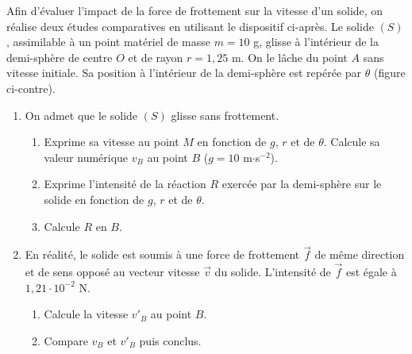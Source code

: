 \documentclass[11pt]{article}
\begin{document}
\begin{minipage}{0.55\linewidth}
Afin d'évaluer l'impact de la force de frottement sur la vitesse d'un solide, on réalise deux études comparatives en utilisant le dispositif ci-après. Le solide $(S)$, assimilable à un point matériel de masse $m = 10$ g, glisse à l'intérieur de la demi-sphère de centre $O$ et de rayon $r = 1{,}25$ m. On le lâche du point $A$ sans vitesse initiale. Sa position à l'intérieur de la demi-sphère est repérée par $\theta$ (figure ci-contre).
\end{minipage}\hfill
\begin{minipage}{0.42\linewidth}
\centering
{}
\end{minipage}

\begin{enumerate}
  \item On admet que le solide $(S)$ glisse sans frottement.
  \begin{enumerate}[label=\alph*.]
    \item Exprime sa vitesse au point $M$ en fonction de $g$, $r$ et de $\theta$. Calcule sa valeur numérique $v_B$ au point $B$ ($g = 10$ m$\cdot$s$^{-2}$).
    \item Exprime l'intensité de la réaction $R$ exercée par la demi-sphère sur le solide en fonction de $g$, $r$ et de $\theta$.
    \item Calcule $R$ en $B$.
  \end{enumerate}
  \item En réalité, le solide est soumis à une force de frottement $\vec{f}$ de même direction et de sens opposé au vecteur vitesse $\vec{v}$ du solide. L'intensité de $\vec{f}$ est égale à $1{,}21\cdot10^{-2}$ N.
  \begin{enumerate}[label=\alph*.]
    \item Calcule la vitesse $v'_B$ au point $B$.
    \item Compare $v_B$ et $v'_B$ puis conclus.
  \end{enumerate}
\end{enumerate}
\end{document}
